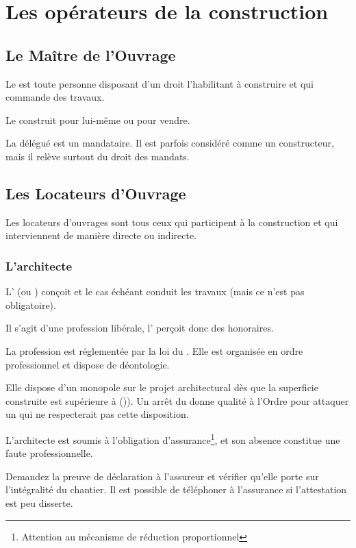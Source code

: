 
\chapter{Les opérateurs de la construction}

	\section{Le Maître de l'Ouvrage}

		Le \Mo{} est toute personne disposant d'un droit l'habilitant à construire et qui commande des travaux.

		Le \Mo{} construit pour lui-même ou pour vendre.

		La \Mo{} délégué est un mandataire. Il est parfois considéré comme un constructeur, mais il relève surtout du droit des mandats.

	\section{Les Locateurs d'Ouvrage}

		Les locateurs d'ouvrages sont tous ceux qui participent à la construction et qui interviennent de manière directe ou indirecte.

		\subsection{L'architecte}

			L'\archi{} (ou \Moe) conçoit et le cas échéant conduit les travaux (mais ce n'est pas obligatoire).

			Il s'agit d'une profession libérale, l'\archi{} perçoit donc des honoraires.

			La profession est réglementée par la loi du . Elle est organisée en ordre professionnel et dispose de déontologie.

			Elle dispose d'un monopole sur le projet architectural dès que la superficie construite est supérieure à   ()). Un arrêt du \CE{} donne qualité à l'Ordre pour attaquer un \PC{} qui ne respecterait pas cette disposition.

			L'architecte est soumis à l'obligation d'assurance\footnote{Attention au mécanisme de réduction proportionnel}, et son absence constitue une faute professionnelle.

			\begin{conseil}
				Demandez la preuve de déclaration à l'assureur et vérifier qu'elle porte sur l'intégralité du chantier. Il est possible de téléphoner à l'assurance si l'attestation est peu disserte.
			\end{conseil}

